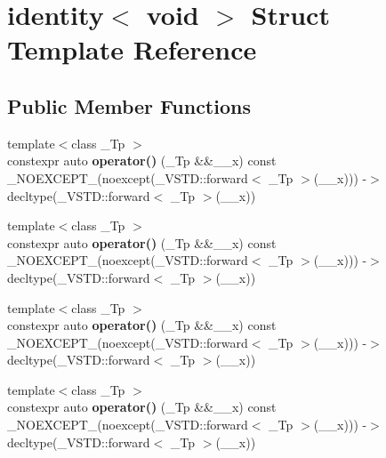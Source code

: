 \hypertarget{structidentity_3_01void_01_4}{}\section{identity$<$ void $>$ Struct Template Reference}
\label{structidentity_3_01void_01_4}
\subsection*{Public Member Functions}
\begin{DoxyCompactItemize}
\item 
\mbox{\label{structidentity_3_01void_01_4_af3150fbb3b793518e8ac6c626f47f390}} 
{\footnotesize template$<$class \+\_\+\+Tp $>$ }\\constexpr auto {\bfseries operator()} (\+\_\+\+Tp \&\&\+\_\+\+\_\+x) const \+\_\+\+N\+O\+E\+X\+C\+E\+P\+T\+\_\+(noexcept(\+\_\+\+V\+S\+T\+D\+::forward$<$ \+\_\+\+Tp $>$(\+\_\+\+\_\+x))) -\/$>$ decltype(\+\_\+\+V\+S\+T\+D\+::forward$<$ \+\_\+\+Tp $>$(\+\_\+\+\_\+x))
\item 
\mbox{\label{structidentity_3_01void_01_4_af3150fbb3b793518e8ac6c626f47f390}} 
{\footnotesize template$<$class \+\_\+\+Tp $>$ }\\constexpr auto {\bfseries operator()} (\+\_\+\+Tp \&\&\+\_\+\+\_\+x) const \+\_\+\+N\+O\+E\+X\+C\+E\+P\+T\+\_\+(noexcept(\+\_\+\+V\+S\+T\+D\+::forward$<$ \+\_\+\+Tp $>$(\+\_\+\+\_\+x))) -\/$>$ decltype(\+\_\+\+V\+S\+T\+D\+::forward$<$ \+\_\+\+Tp $>$(\+\_\+\+\_\+x))
\item 
\mbox{\label{structidentity_3_01void_01_4_af3150fbb3b793518e8ac6c626f47f390}} 
{\footnotesize template$<$class \+\_\+\+Tp $>$ }\\constexpr auto {\bfseries operator()} (\+\_\+\+Tp \&\&\+\_\+\+\_\+x) const \+\_\+\+N\+O\+E\+X\+C\+E\+P\+T\+\_\+(noexcept(\+\_\+\+V\+S\+T\+D\+::forward$<$ \+\_\+\+Tp $>$(\+\_\+\+\_\+x))) -\/$>$ decltype(\+\_\+\+V\+S\+T\+D\+::forward$<$ \+\_\+\+Tp $>$(\+\_\+\+\_\+x))
\item 
\mbox{\label{structidentity_3_01void_01_4_af3150fbb3b793518e8ac6c626f47f390}} 
{\footnotesize template$<$class \+\_\+\+Tp $>$ }\\constexpr auto {\bfseries operator()} (\+\_\+\+Tp \&\&\+\_\+\+\_\+x) const \+\_\+\+N\+O\+E\+X\+C\+E\+P\+T\+\_\+(noexcept(\+\_\+\+V\+S\+T\+D\+::forward$<$ \+\_\+\+Tp $>$(\+\_\+\+\_\+x))) -\/$>$ decltype(\+\_\+\+V\+S\+T\+D\+::forward$<$ \+\_\+\+Tp $>$(\+\_\+\+\_\+x))
\end{DoxyCompactItemize}



